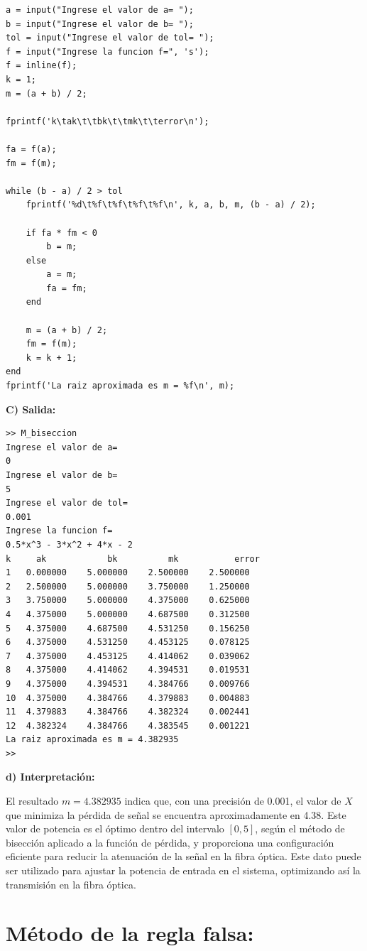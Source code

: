 \documentclass[12pt,a4paper,twoside]{article}  %
\begin{document}
\begin{lstlisting}
a = input("Ingrese el valor de a= ");
b = input("Ingrese el valor de b= ");
tol = input("Ingrese el valor de tol= ");
f = input("Ingrese la funcion f=", 's');
f = inline(f);  
k = 1;          
m = (a + b) / 2; 

fprintf('k\tak\t\tbk\t\tmk\t\terror\n');

fa = f(a);
fm = f(m);

while (b - a) / 2 > tol
    fprintf('%d\t%f\t%f\t%f\t%f\n', k, a, b, m, (b - a) / 2);
    
    if fa * fm < 0  
        b = m;      
    else
        a = m;      
        fa = fm;    
    end
    
    m = (a + b) / 2;
    fm = f(m); 
    k = k + 1;  
end
fprintf('La raiz aproximada es m = %f\n', m);

\end{lstlisting}

\textbf{C) Salida:}

\begin{verbatim}
>> M_biseccion
Ingrese el valor de a= 
0
Ingrese el valor de b= 
5
Ingrese el valor de tol= 
0.001
Ingrese la funcion f=
0.5*x^3 - 3*x^2 + 4*x - 2
k	  ak		    bk	    	mk		     error
1	0.000000	5.000000	2.500000	2.500000
2	2.500000	5.000000	3.750000	1.250000
3	3.750000	5.000000	4.375000	0.625000
4	4.375000	5.000000	4.687500	0.312500
5	4.375000	4.687500	4.531250	0.156250
6	4.375000	4.531250	4.453125	0.078125
7	4.375000	4.453125	4.414062	0.039062
8	4.375000	4.414062	4.394531	0.019531
9	4.375000	4.394531	4.384766	0.009766
10	4.375000	4.384766	4.379883	0.004883
11	4.379883	4.384766	4.382324	0.002441
12	4.382324	4.384766	4.383545	0.001221
La raiz aproximada es m = 4.382935
>> 
\end{verbatim}

\textbf{d) Interpretación:}

El resultado \( m = 4.382935 \) indica que, con una precisión de 0.001, el valor de \( X \) que minimiza la pérdida de señal se encuentra aproximadamente en 4.38. Este valor de potencia es el óptimo dentro del intervalo \([0,5]\), según el método de bisección aplicado a la función de pérdida, y proporciona una configuración eficiente para reducir la atenuación de la señal en la fibra óptica. Este dato puede ser utilizado para ajustar la potencia de entrada en el sistema, optimizando así la transmisión en la fibra óptica.

\section{Método de la regla falsa:}
\end{document}
